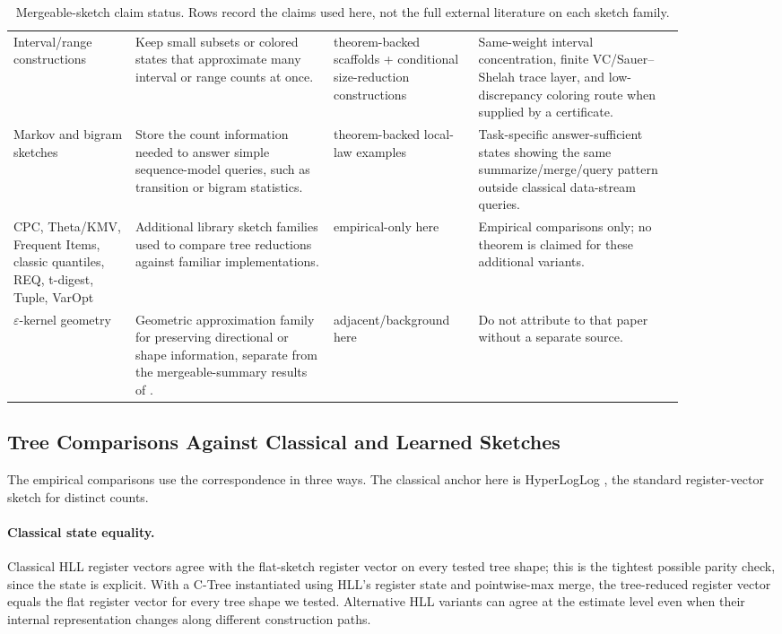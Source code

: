 \begin{table}[t]
\begin{tabular}{@{}p{0.16\linewidth}p{0.26\linewidth}p{0.18\linewidth}p{0.27\linewidth}@{}}
Interval/range constructions & Keep small subsets or colored states that approximate many interval or range counts at once. & theorem-backed scaffolds + conditional size-reduction constructions & Same-weight interval concentration, finite VC/Sauer--Shelah trace layer, and low-discrepancy coloring route when supplied by a certificate. \\
Markov and bigram sketches & Store the count information needed to answer simple sequence-model queries, such as transition or bigram statistics. & theorem-backed local-law examples & Task-specific answer-sufficient states showing the same summarize/merge/query pattern outside classical data-stream queries. \\
CPC, Theta/KMV, Frequent Items, classic quantiles, REQ, t-digest, Tuple, VarOpt & Additional library sketch families used to compare tree reductions against familiar implementations. & empirical-only here & Empirical comparisons only; no theorem is claimed for these additional variants. \\
\(\varepsilon\)-kernel geometry & Geometric approximation family for preserving directional or shape information, separate from the mergeable-summary results of \citet{Agarwal2013MergeableTODS}. & adjacent/background here & Do not attribute to that paper without a separate source. \\
\bottomrule
\end{tabular}
\caption{Mergeable-sketch claim status. Rows record the claims used
here, not the full external literature on each sketch family.}
\label{tab:v7-sketch-inventory}
\end{table}

\subsection{Tree Comparisons Against Classical and Learned Sketches}
\label{sec:v7-tree-comparisons}

The empirical comparisons use the correspondence in three ways. The
classical anchor here is HyperLogLog
\citep{FlajoletEtAl2007,HeuleEtAl2013}, the standard register-vector
sketch for distinct counts.

\paragraph{Classical state equality.}
Classical HLL register vectors agree with the flat-sketch register
vector on every tested tree shape; this is the tightest possible parity
check, since the state is explicit. With a C-Tree instantiated using
HLL's register state and pointwise-max merge, the tree-reduced register
vector equals the flat register vector for every tree shape we tested.
Alternative HLL variants can agree at the estimate level even when
their internal representation changes along different construction
paths.

